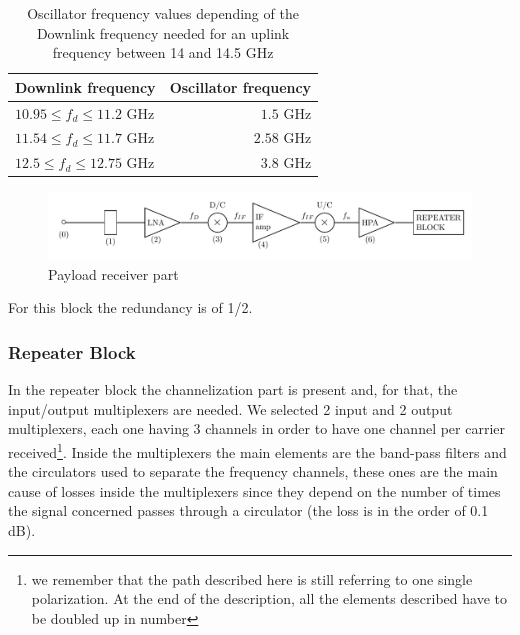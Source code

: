 \documentclass[11pt,a4paper,titlepage]{article}
\begin{document}
			\begin{table}
			\centering
			\begin{tabular}{lr}
			\toprule
			Downlink frequency & Oscillator frequency\\
			\midrule
			$10.95 \leq f_d \leq 11.2$ GHz & $1.5$ GHz\\
			$11.54 \leq f_d \leq 11.7$ GHz & $2.58$ GHz\\
			$12.5 \leq f_d \leq 12.75$ GHz & $3.8$ GHz\\
			\bottomrule
			\end{tabular}
			\caption{Oscillator frequency values depending of the Downlink frequency needed for an uplink frequency between 14 and 14.5 GHz}
			\label{tab:oscillator}
		\end{table}
		\begin{figure}[h]
			\centering
			\includegraphics[width = \textwidth]{payload_receiver.pdf}
			\caption{Payload receiver part}
			\label{fig:receiver}
		\end{figure}
For this block the redundancy is of 1/2.

		\subsubsection{Repeater Block}
			In the repeater block the channelization part is present and, for that, the input/output multiplexers are needed. We selected 2 input and 2 output multiplexers, each one having 3 channels in order to have one channel per carrier received\footnote{we remember that the path described here is still referring to one single polarization. At the end of the description, all the elements described have to be doubled up in number}. Inside the multiplexers the main elements are the band-pass filters and the circulators used to separate the frequency channels, these ones are the main cause of losses inside the multiplexers since they depend on the number of times the signal concerned passes through a circulator (the loss is in the order of 0.1 dB). \cite{Maral2017}
\end{document}
